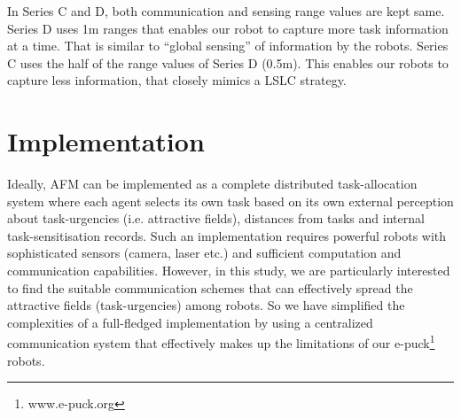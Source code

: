 \documentclass[journal]{IEEEtran}
\begin{document}

In Series C and D, both communication and sensing range values are kept same. Series D uses 1m ranges that enables our robot to capture more task information at a time. That is similar to  ``global sensing'' of information by the robots. Series C uses the half of the range values of Series D (0.5m). This enables our robots to capture less information, that closely mimics a LSLC strategy. 
\section{Implementation}
\label{sec:imp}
Ideally, AFM can be implemented as a complete distributed task-allocation system where each agent selects its own task based on its own external perception about task-urgencies (i.e. attractive fields),  distances from tasks and internal task-sensitisation records. Such an implementation requires powerful robots with sophisticated sensors (camera, laser etc.) and sufficient computation and communication  capabilities. However, in this study, we are particularly interested to find the suitable communication schemes that can effectively spread the attractive fields (task-urgencies) among robots. So we have simplified the complexities of a full-fledged implementation by using a centralized communication system  that effectively makes up the limitations of our e-puck\footnote{www.e-puck.org} robots.  
\end{document}
